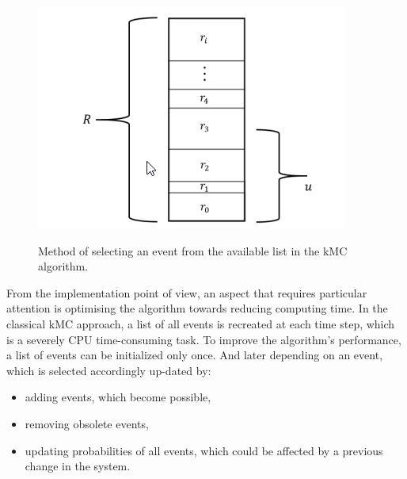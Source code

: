 \documentclass[journal,article,submit,pdftex,moreauthors]{Definitions/mdpi}
\begin{document}
    \begin{figure}[H]
    \captionsetup{justification=centering}
    \centering
    \includegraphics{Definitions/picture3.png}
    \label{fig:obraz3}
    \caption{Method of selecting an event from the available list in the kMC algorithm.}
    \end{figure}
    From the implementation point of view, an aspect that requires particular attention is optimising the algorithm towards reducing computing time. In the classical kMC approach, a list of all events is recreated at each time step, which is a severely CPU time-consuming task. To improve the algorithm’s performance, a list of events can be initialized only once. And later depending on an event, which is selected accordingly up-dated by: 
    \begin{itemize}
        \item adding events, which become possible,
        \item removing obsolete events,
        \item updating probabilities of all events, which could be affected by a previous change in the system.
    \end{itemize}
 
\end{document}
